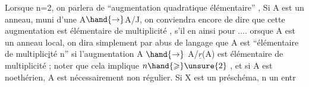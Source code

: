 Lorsque n=2, on parlera de ``augmentation  quadratique élémentaire'' ,
Si A est un anneau,  muni d'une  A$\hand{\to}$A/J,
on conviendra encore de dire que cette augmentation est élémentaire de
multiplicité  , s'il en  ainsi pour .... orsque A est un anneau
local, on dira simplement par abus de langage que A est ``élémentaire de
multiplic\uline{i}té n'' si l'augmentation A $\hand{\to}$ A/$\underline{r}$(A) est élémentaire de
multiplicité ; noter que cela implique $n \hand{\geqslant} \unsure{2}$ , et si A est noethérien,
A est nécessairement non régulier. Si X est un préschéma, n un entr

